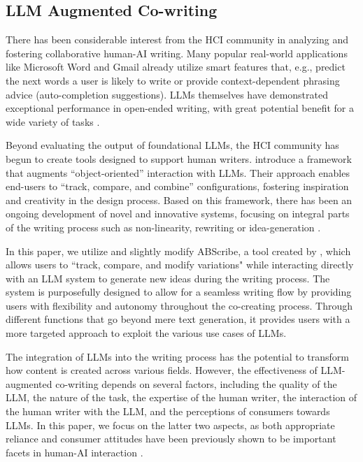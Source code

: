 \subsection{LLM Augmented Co-writing}
There has been considerable interest from the HCI community in analyzing and fostering collaborative human-AI writing. Many popular real-world applications like Microsoft Word and Gmail already utilize smart features that, e.g., predict the next words a user is likely to write or provide context-dependent phrasing advice (auto-completion suggestions). LLMs themselves have demonstrated exceptional performance in open-ended writing, with great potential benefit for a wide variety of tasks \cite{lee2022coauthor,macneil2022automatically,meyer2022we,mirowski2023co,yuan2022wordcraft,zhao2023more,herbold2023ai}. 



Beyond evaluating the output of foundational LLMs, the HCI community has begun to create tools designed to support human writers. \citet{Kim2023-wn} introduce a framework that augments ``object-oriented'' interaction with LLMs. Their approach enables end-users to ``track, compare, and combine'' configurations, fostering inspiration and creativity in the design process. Based on this framework, there has been an ongoing development of novel and innovative systems, focusing on integral parts of the writing process such as non-linearity, rewriting or idea-generation \cite{Reza2023-hp,lu2024corporate, teufelberger2024llm}.

In this paper, we utilize and slightly modify ABScribe, a tool created by \citet{Reza2023-hp}, which allows users to ``track, compare, and modify variations" while interacting directly with an LLM system to generate new ideas during the writing process. The system is purposefully designed to allow for a seamless writing flow by providing users with flexibility and autonomy throughout the co-creating process. Through different functions that go beyond mere text generation, it provides users with a more targeted approach to exploit the various use cases of LLMs. 

The integration of LLMs into the writing process has the potential to transform how content is created across various fields. However, the effectiveness of LLM-augmented co-writing depends on several factors, including the quality of the LLM, the nature of the task, the expertise of the human writer, the interaction of the human writer with the LLM, and the perceptions of consumers towards LLMs. In this paper, we focus on the latter two aspects, as both appropriate reliance and consumer attitudes have been previously shown to be important facets in human-AI interaction  \cite{He_2023,sara_23,schemmer2023appropriate,erlei2024understanding,wester2024exploring,grassini2024understanding}.



